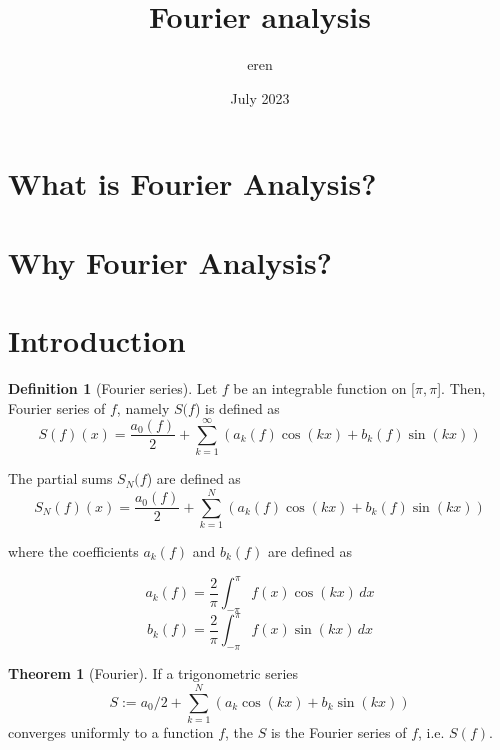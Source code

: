 \documentclass{article}
\title{Fourier analysis}
\author{eren}
\date{July 2023}
\theoremstyle{remark}
\theoremstyle{lemma}
\theoremstyle{example}
\theoremstyle{proofTrial}
\theoremstyle{definition}
\newtheorem{definition}{Definition}
\newtheorem{theorem}{Theorem}
\begin{document}
\maketitle

\section{What is Fourier Analysis?}
\section{Why Fourier Analysis?}

\section{Introduction}
\begin{definition}[Fourier series]\footnotemark{}
    Let \(f\) be an integrable function on [$\pi, \pi$]. Then, Fourier series of \(f\), namely $S($\(f\)) is defined as
    \[
    S(f)(x) = \frac{a_0(f)}{2} +  \sum_{k = 1}^{\infty} (a_k(f)  \cos(kx) + b_k(f)  \sin(kx))
    \]

    The partial sums $S_N($\(f\)) are defined as
    \[
    S_N(f)(x) = \frac{a_0(f)}{2} +  \sum_{k = 1}^{N} (a_k(f)  \cos(kx) + b_k(f)  \sin(kx))
    \]

    where the coefficients $a_k(f)$ and $b_k(f)$ are defined as

    \[
    a_k(f) = \frac{2}{\pi}\int_{-\pi}^{\pi} f(x) \cos(kx)\,dx
    \]
    \[
    b_k(f) = \frac{2}{\pi}\int_{-\pi}^{\pi} f(x) \sin(kx)\,dx
    \]
\end{definition}
\begin{theorem}[Fourier]
    If a trigonometric series
    \[
    S := a_0  / 2 +  \sum_{k = 1}^{N} (a_k  \cos(kx) + b_k  \sin(kx))
    \]
   converges uniformly to a function \(f\), the $S$ is the Fourier series of \(f\), i.e. $S(f)$.
\end{theorem}
\end{document}
